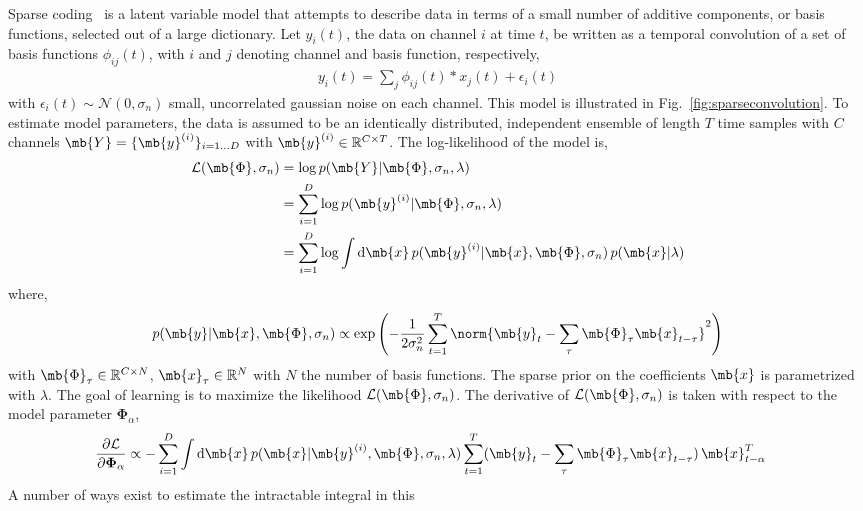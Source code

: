 Sparse coding~\cite{Olshausen96,olshausen2003learning,Smith:2006qf} is
a latent variable model that attempts to describe data in terms of a
small number of additive components, or basis functions, selected out
of a large dictionary. Let $y_i(t)$, the data on channel $i$ at time
$t$, be written as a temporal convolution of a set of basis functions
$\phi_{ij}(t)$, with $i$ and $j$ denoting channel and basis function,
respectively,
\begin{align}
y_i(t) = \sum_j \phi_{ij}(t) * x_j(t) + \epsilon_{i}(t) \label{eqn:conv}
\end{align}
with $\epsilon_i(t) \sim \mathcal{N}(0,\sigma_n)$ small, uncorrelated
gaussian noise on each channel. This model is illustrated in
Fig.~\ref{fig:sparseconvolution}. To estimate model parameters, the
data is assumed to be an identically distributed, independent ensemble
of length $T$ time samples with $C$ channels $\mb{Y} =
\{\mb{y}^{(i)}\}_{i=1\ldots D}$ with $\mb{y}^{(i)} \in \mathbb{R}^{C
  \times T}$. The log-likelihood of the model is,
\begin{align*}
\mathcal{L}(\mb{\Phi}, \sigma_n)
&= \log p(\mb{Y} | \mb{\Phi}, \sigma_n, \lambda) \\
&= \sum_{i=1}^D \log p(\mb{y}^{(i)} | \mb{\Phi}, \sigma_n, \lambda) \\
&= \sum_{i=1}^D \log \int \mathrm{d} \mb{x} \, p(\mb{y}^{(i)}
| \mb{x}, \mb{\Phi}, \sigma_n) \, p(\mb{x} | \lambda)
\end{align*}
where,
\begin{align*}
  p(\mb{y} | \mb{x}, \mb{\Phi}, \sigma_n) \propto
  \exp\left(-\frac{1}{2 \sigma_n^2} \sum_{t=1}^T \norm{\mb{y}_t -
      \sum_\tau \mb{\Phi}_\tau \mb{x}_{t-\tau}}^2\right)
\end{align*}
with $\mb{\Phi}_\tau \in \mathbb{R}^{C \times N}$, $\mb{x}_\tau \in
\mathbb{R}^N$ with $N$ the number of basis functions. The sparse prior
on the coefficients $\mb{x}$ is parametrized with $\lambda$. The goal
of learning is to maximize the likelihood $\mathcal{L}(\mb{\Phi},
\sigma_n)$. The derivative of $\mathcal{L}(\mb{\Phi}, \sigma_n)$ is
taken with respect to the model parameter $\mathbf{\Phi}_\alpha$,
\begin{align*}
  \frac{\partial \mathcal{L}}{\partial \mathbf{\Phi}_\alpha} &\propto
  - \sum_{i=1}^D {\int \mathrm{d} \mb{x} \, p(\mb{x} | \mb{y}^{(i)},
    \mb{\Phi}, \sigma_n, \lambda) \sum_{t=1}^T (\mb{y}_t - \sum_\tau
    \mb{\Phi}_\tau \mb{x}_{t-\tau}) \,\mb{x}_{t-\alpha}^T}
\end{align*}
A number of ways exist to estimate the intractable integral in this
